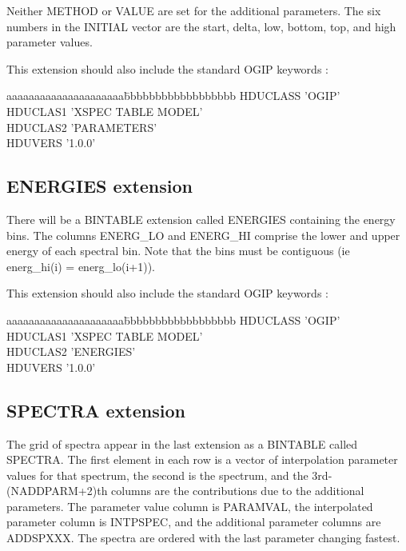 \documentclass[11pt]{article}
\begin{document}
Neither METHOD or VALUE are set for the additional parameters. The six
numbers in the INITIAL vector are the start, delta, low, bottom, top,
and high parameter values.

This extension should also include the standard OGIP keywords :

\begin{tabbing}
aaaaaaaaaaaaaaaaaaaaa\=bbbbbbbbbbbbbbbbbb\kill
HDUCLASS             \> 'OGIP'           \\
HDUCLAS1             \> 'XSPEC TABLE MODEL'    \\
HDUCLAS2             \> 'PARAMETERS'    \\
HDUVERS              \> '1.0.0'          \\
\end{tabbing}

\subsection{ENERGIES extension}

There will be a BINTABLE extension called ENERGIES containing the
energy bins. The columns ENERG\_LO and ENERG\_HI comprise the lower
and upper energy of each spectral bin. Note that the bins must be
contiguous (ie energ\_hi(i) = energ\_lo(i+1)).

This extension should also include the standard OGIP keywords :

\begin{tabbing}
aaaaaaaaaaaaaaaaaaaaa\=bbbbbbbbbbbbbbbbbb\kill
HDUCLASS             \> 'OGIP'           \\
HDUCLAS1             \> 'XSPEC TABLE MODEL'    \\
HDUCLAS2             \> 'ENERGIES'    \\
HDUVERS              \> '1.0.0'          \\
\end{tabbing}

\subsection{SPECTRA extension}

The grid of spectra appear in the last extension as a BINTABLE called
SPECTRA. The first element in each row is a vector of interpolation 
parameter values for that spectrum, the second is the spectrum, and the 
3rd-(NADDPARM+2)th columns are the contributions due to the additional
parameters. The parameter value column is PARAMVAL, the interpolated
parameter column is INTPSPEC, and the additional parameter columns are
ADDSPXXX. The spectra are ordered with the last parameter changing
fastest.
\end{document}
